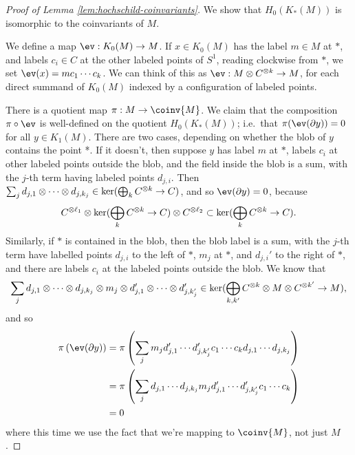 \begin{proof}[Proof of Lemma \ref{lem:hochschild-coinvariants}]
We show that $H_0(K_*(M))$ is isomorphic to the coinvariants of $M$.

We define a map $\ev: K_0(M) \to M$.
If $x \in K_0(M)$ has the label $m \in M$ at $*$, and labels $c_i \in C$ at the other 
labeled points of $S^1$, reading clockwise from $*$,
we set $\ev(x) = m c_1 \cdots c_k$.
We can think of this as $\ev : M \tensor C^{\tensor k} \to M$, for each direct summand of 
$K_0(M)$ indexed by a configuration of labeled points.

There is a quotient map $\pi: M \to \coinv{M}$.
We claim that the composition $\pi \compose \ev$ is well-defined on the quotient $H_0(K_*(M))$; 
i.e.\ that $\pi(\ev(\bd y)) = 0$ for all $y \in K_1(M)$.
There are two cases, depending on whether the blob of $y$ contains the point *.
If it doesn't, then
suppose $y$ has label $m$ at $*$, labels $c_i$ at other labeled points outside the blob, 
and the field inside the blob is a sum, with the $j$-th term having
labeled points $d_{j,i}$.
Then $\sum_j d_{j,1} \otimes \cdots \otimes d_{j,k_j} \in \ker(\bigoplus_k C^{\otimes k} \to C)$, and so
$\ev(\bdy y) = 0$, because $$C^{\otimes \ell_1} \otimes \ker(\bigoplus_k C^{\otimes k} \to C) \otimes C^{\otimes \ell_2} \subset \ker(\bigoplus_k C^{\otimes k} \to C).$$
Similarly, if $*$ is contained in the blob, then the blob label is a sum, with the 
$j$-th term have labelled points $d_{j,i}$ to the left of $*$, $m_j$ at $*$, and $d_{j,i}'$ to the right of $*$,
and there are labels $c_i$ at the labeled points outside the blob.
We know that
$$\sum_j d_{j,1} \otimes \cdots \otimes d_{j,k_j} \otimes m_j \otimes d_{j,1}' \otimes \cdots \otimes d_{j,k'_j}' \in \ker(\bigoplus_{k,k'} C^{\otimes k} \otimes M \otimes C^{\otimes k'} \to M),$$
and so
\begin{align*}
\pi\left(\ev(\bdy y)\right) & = \pi\left(\sum_j m_j d_{j,1}' \cdots d_{j,k'_j}' c_1 \cdots c_k d_{j,1} \cdots d_{j,k_j}\right) \\
            & = \pi\left(\sum_j d_{j,1} \cdots d_{j,k_j} m_j d_{j,1}' \cdots d_{j,k'_j}' c_1 \cdots c_k\right) \\
            & = 0
\end{align*}
where this time we use the fact that we're mapping to $\coinv{M}$, not just $M$.


\end{proof}
